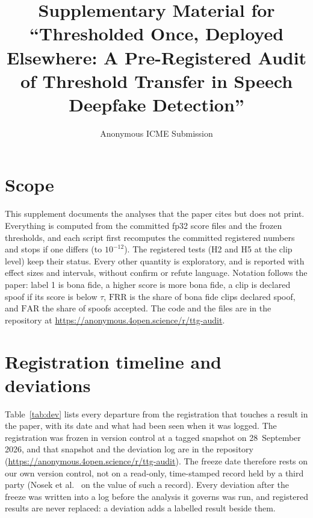 \documentclass[10pt]{article}
\title{Supplementary Material for\\ ``Thresholded Once, Deployed Elsewhere: A Pre-Registered Audit of Threshold Transfer in Speech
Deepfake Detection''}
\author{Anonymous ICME Submission}
\date{}
\newcommand{\repo}{\url{https://anonymous.4open.science/r/ttg-audit}}
\newcommand{\frr}{\mathrm{FRR}}
\newcommand{\far}{\mathrm{FAR}}
\begin{document}
\maketitle

\section{Scope}
This supplement documents the analyses that the paper cites but does not print. Everything is computed from the committed fp32 score
files and the frozen thresholds, and each script first recomputes the committed registered numbers and stops if one differs (to
\(10^{-12}\)). The registered tests (H2 and H5 at the clip level) keep their status. Every other quantity is exploratory, and is reported
with effect sizes and intervals, without confirm or refute language. Notation follows the paper: label 1 is bona fide, a higher score is
more bona fide, a clip is declared spoof if its score is below \(\tau\), \(\frr\) is the share of bona fide clips declared spoof, and
\(\far\) the share of spoofs accepted. The code and the files are in the repository at \repo.

\section{Registration timeline and deviations}
Table~\ref{tab:dev} lists every departure from the registration that touches a result in the paper, with its date and what had been seen
when it was logged. The registration was frozen in version control at a tagged snapshot on 28~September 2026, and that snapshot and the deviation log are in the repository (\repo). The freeze date therefore rests on our own version control, not on a read-only, time-stamped record held by a third party (Nosek et al.\ \cite{nosek18_prereg} on the value of such a record). Every
deviation after the freeze was written into a log before the analysis it governs was run, and registered results are never replaced: a
deviation adds a labelled result beside them.
\end{document}

